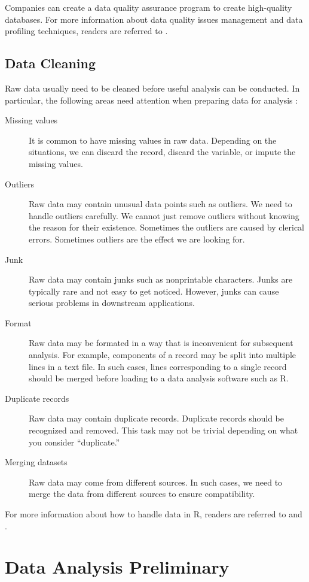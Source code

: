 \documentclass[12pt]{article}
\begin{document}
Companies can create a data quality assurance program to create high-quality databases. For more information about data quality issues management and data profiling techniques, readers are referred to \citep{olson2003}.

\subsection{Data Cleaning}

Raw data usually need to be cleaned before useful analysis can be conducted. In particular, the following areas need attention when preparing data for analysis \citep{janert2010}:
\begin{description}
\item[Missing values] It is common to have missing values in raw data. Depending on the situations, we can discard the record, discard the variable, or impute the missing values.
\item[Outliers] Raw data may contain unusual data points such as outliers. We need to handle outliers carefully. We cannot just remove outliers without knowing the reason for their existence. Sometimes the outliers are caused by clerical errors. Sometimes outliers are the effect we are looking for.
\item[Junk] Raw data may contain junks such as nonprintable characters. Junks are typically rare and not easy to get noticed. However, junks can cause serious problems in downstream applications.
\item[Format] Raw data may be formated in a way that is inconvenient for subsequent analysis. For example, components of a record may be split into multiple lines in a text file. In such cases, lines corresponding to a single record should be merged before loading to a data analysis software such as R.
\item[Duplicate records] Raw data may contain duplicate records. Duplicate records should be recognized and removed. This task may not be trivial depending on what you consider ``duplicate.''
\item[Merging datasets] Raw data may come from different sources. In such cases, we need to merge the data from different sources to ensure compatibility.
\end{description}

For more information about how to handle data in R, readers are referred to \citep{forte2015} and \citep{buttrey2017}.

\section{Data Analysis Preliminary}
\end{document}
